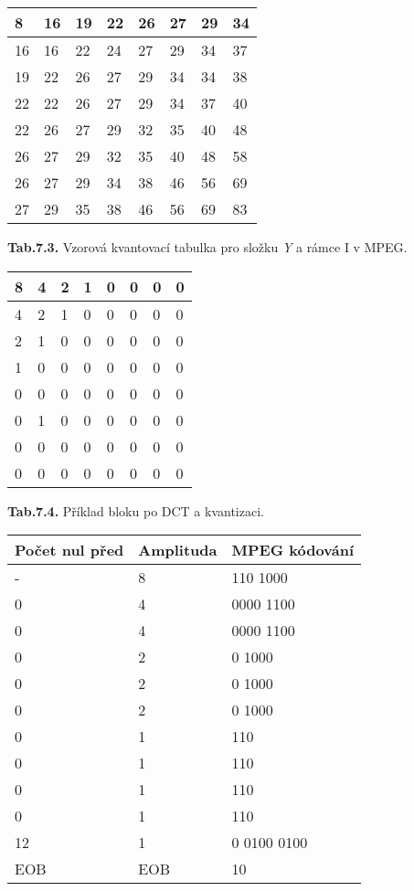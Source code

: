 \noindent 

\noindent 

\begin{tabular}{|p{0.2in}|p{0.2in}|p{0.2in}|p{0.2in}|p{0.2in}|p{0.2in}|p{0.2in}|p{0.2in}|} \hline 
8 & 16 & 19 & 22 & 26 & 27 & 29 & 34 \\ \hline 
16 & 16 & 22 & 24 & 27 & 29 & 34 & 37 \\ \hline 
19 & 22 & 26 & 27 & 29 & 34 & 34 & 38 \\ \hline 
22 & 22 & 26 & 27 & 29 & 34 & 37 & 40 \\ \hline 
22 & 26 & 27 & 29 & 32 & 35 & 40 & 48 \\ \hline 
26 & 27 & 29 & 32 & 35 & 40 & 48 & 58 \\ \hline 
26 & 27 & 29 & 34 & 38 & 46 & 56 & 69 \\ \hline 
27 & 29 & 35 & 38 & 46 & 56 & 69 & 83 \\ \hline 
\end{tabular}

\textbf{Tab.7.3.} Vzorová kvantovací tabulka pro složku \textit{Y} a rámce I v MPEG.

\begin{tabular}{|p{0.2in}|p{0.2in}|p{0.2in}|p{0.2in}|p{0.2in}|p{0.2in}|p{0.2in}|p{0.2in}|} \hline 
8 & 4 & 2 & 1 & 0 & 0 & 0 & 0 \\ \hline 
4 & 2 & 1 & 0 & 0 & 0 & 0 & 0 \\ \hline 
2 & 1 & 0 & 0 & 0 & 0 & 0 & 0 \\ \hline 
1 & 0 & 0 & 0 & 0 & 0 & 0 & 0 \\ \hline 
0 & 0 & 0 & 0 & 0 & 0 & 0 & 0 \\ \hline 
0 & 1 & 0 & 0 & 0 & 0 & 0 & 0 \\ \hline 
0 & 0 & 0 & 0 & 0 & 0 & 0 & 0 \\ \hline 
0 & 0 & 0 & 0 & 0 & 0 & 0 & 0 \\ \hline 
\end{tabular}

\textbf{Tab.7.4.} Příklad bloku po DCT a kvantizaci.

\noindent 

\noindent 

\begin{tabular}{|p{0.6in}|p{0.6in}|p{0.6in}|} \hline 
Počet nul před & Amplituda & MPEG kódování \\ \hline 
- & 8 & 110 1000 \\ \hline 
0 & 4 & 0000 1100 \\ \hline 
0 & 4 & 0000 1100 \\ \hline 
0 & 2 & 0 1000 \\ \hline 
0 & 2 & 0 1000 \\ \hline 
0 & 2 & 0 1000 \\ \hline 
0 & 1 & 110 \\ \hline 
0 & 1 & 110 \\ \hline 
0 & 1 & 110 \\ \hline 
0 & 1 & 110 \\ \hline 
12 & 1 & 0 0100 0100 \\ \hline 
EOB & EOB & 10 \\ \hline 
\end{tabular}

